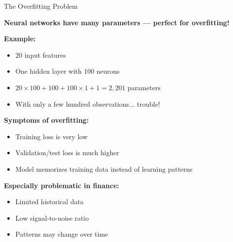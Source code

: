 \documentclass[10pt]{beamer}
\begin{document}
\begin{frame}{The Overfitting Problem}

  \textbf{Neural networks have many parameters --- perfect for overfitting!}

  \vspace{1em}
  \textbf{Example:}
  \begin{itemize}
    \item 20 input features
    \item One hidden layer with 100 neurons
    \item $20 \times 100 + 100 + 100 \times 1 + 1 = 2{,}201$ parameters
    \item With only a few hundred observations... trouble!
  \end{itemize}

  \vspace{1em}
  \textbf{Symptoms of overfitting:}
  \begin{itemize}
    \item Training loss is very low
    \item Validation/test loss is much higher
    \item Model memorizes training data instead of learning patterns
  \end{itemize}

  \vspace{0.5em}
  \textbf{Especially problematic in finance:}
  \begin{itemize}
    \item Limited historical data
    \item Low signal-to-noise ratio
    \item Patterns may change over time
  \end{itemize}
\end{frame}

\end{document}
